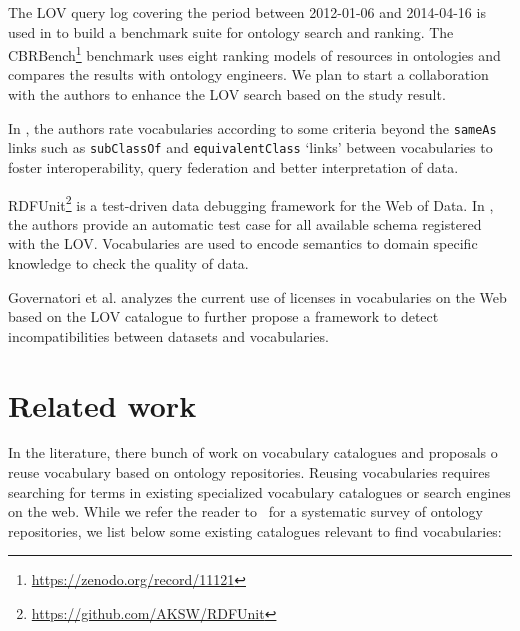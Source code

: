 \documentclass{iosart2c}
\newcommand{\ghis}[1]{\textcolor{brown}{\textbf{[GHIS TO:#1]}}}
\begin{document}
The LOV query log covering the period between 2012-01-06 and 2014-04-16 is used in \cite{butt2014} to build a benchmark suite for ontology search and ranking. The CBRBench\footnote{\url{https://zenodo.org/record/11121}} benchmark uses eight ranking models of resources in ontologies and compares the results with ontology engineers. We plan to start a collaboration with the authors to enhance the LOV search based on the study result.

In \cite{janowicz2014five}, the authors rate vocabularies according to some criteria beyond the \texttt{sameAs} links such as \texttt{subClassOf} and \texttt{equivalentClass} `links' between vocabularies to foster interoperability, query federation and better interpretation of data. %

RDFUnit\footnote{\url{https://github.com/AKSW/RDFUnit}} is a test-driven data debugging framework for the Web of Data. In \cite{rdfunit}, the authors provide an automatic test case for all available schema registered with the LOV. Vocabularies are used to encode semantics to domain specific knowledge to check the quality of data.

Governatori et al. \cite{governatori2014} analyzes the current use of licenses in vocabularies on the Web based on the LOV catalogue to further propose a framework to detect incompatibilities between datasets and vocabularies.


\section{Related work}
\label{sec:related}
In the literature, there bunch of work on vocabulary catalogues and proposals o reuse vocabulary based on ontology repositories. Reusing vocabularies requires searching for terms in existing specialized vocabulary catalogues or search engines on the web. While we refer the reader to~\cite{AquinJoWS12} for a systematic survey of ontology repositories, we list below some existing catalogues relevant to find vocabularies:  
\end{document}
